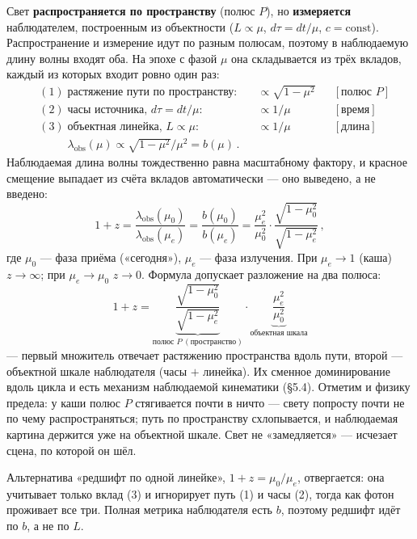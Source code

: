 \documentclass{article}
\begin{document}
Свет \textbf{распространяется по пространству} (полюс $P$), но \textbf{измеряется} наблюдателем, построенным из объектности ($L \propto \mu$, $d\tau = dt/\mu$, $c = \text{const}$). Распространение и измерение идут по разным полюсам, поэтому в наблюдаемую длину волны входят оба. На эпохе с фазой $\mu$ она складывается из трёх вкладов, каждый из которых входит ровно один раз:
\begin{align*}
&(1)\; \text{растяжение пути по пространству:} && \propto \sqrt{1 - \mu^2} && [\text{полюс } P] \\
&(2)\; \text{часы источника, } d\tau = dt/\mu: && \propto 1/\mu && [\text{время}] \\
&(3)\; \text{объектная линейка, } L \propto \mu: && \propto 1/\mu && [\text{длина}] \\[4pt]
&\phantom{(3)\;} \lambda_{\text{obs}}(\mu) \propto \sqrt{1 - \mu^2} / \mu^2 = b(\mu)\,.
\end{align*}
Наблюдаемая длина волны тождественно равна масштабному фактору, и красное смещение выпадает из счёта вкладов автоматически --- оно выведено, а не введено:
\begin{equation}
1 + z = \frac{\lambda_{\text{obs}}(\mu_0)}{\lambda_{\text{obs}}(\mu_e)} = \frac{b(\mu_0)}{b(\mu_e)} = \frac{\mu_e^2}{\mu_0^2}\cdot\frac{\sqrt{1 - \mu_0^2}}{\sqrt{1 - \mu_e^2}}\,,
\end{equation}
где $\mu_0$ --- фаза приёма («сегодня»), $\mu_e$ --- фаза излучения. При $\mu_e \to 1$ (каша) $z \to \infty$; при $\mu_e \to \mu_0$ $z \to 0$. Формула допускает разложение на два полюса:
\begin{equation}
1 + z = \underbrace{\frac{\sqrt{1 - \mu_0^2}}{\sqrt{1 - \mu_e^2}}}_{\text{полюс } P\ (\text{пространство})} \cdot \underbrace{\frac{\mu_e^2}{\mu_0^2}}_{\text{объектная шкала}}
\end{equation}
--- первый множитель отвечает растяжению пространства вдоль пути, второй --- объектной шкале наблюдателя (часы $+$ линейка). Их сменное доминирование вдоль цикла и есть механизм наблюдаемой кинематики (\S5.4). Отметим и физику предела: у каши полюс $P$ стягивается почти в ничто --- свету попросту почти не по чему распространяться; путь по пространству схлопывается, и наблюдаемая картина держится уже на объектной шкале. Свет не «замедляется» --- исчезает сцена, по которой он шёл.

Альтернатива «редшифт по одной линейке», $1 + z = \mu_0/\mu_e$, отвергается: она учитывает только вклад (3) и игнорирует путь (1) и часы (2), тогда как фотон проживает все три. Полная метрика наблюдателя есть $b$, поэтому редшифт идёт по $b$, а не по $L$.
\end{document}
